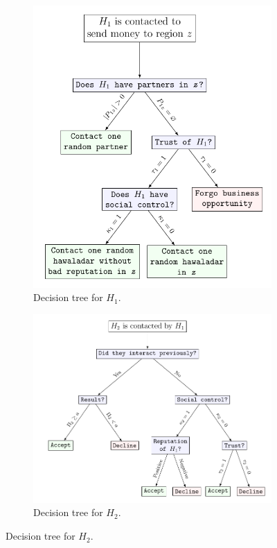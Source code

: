 \documentclass[12pt]{article}
\begin{document}
\begin{figure}[ht]
\begin{subfigure}{.5\textwidth}
 \centering
\includegraphics[height=.99\linewidth]{sender}  
 \caption{Decision tree for $H_1$.}
\end{subfigure}
\begin{subfigure}{.5\textwidth}
\centering
\includegraphics[height=.99\linewidth]{receiver}  
\caption{Decision tree for $H_2$.}
\end{subfigure}
\end{figure}
\end{document}
